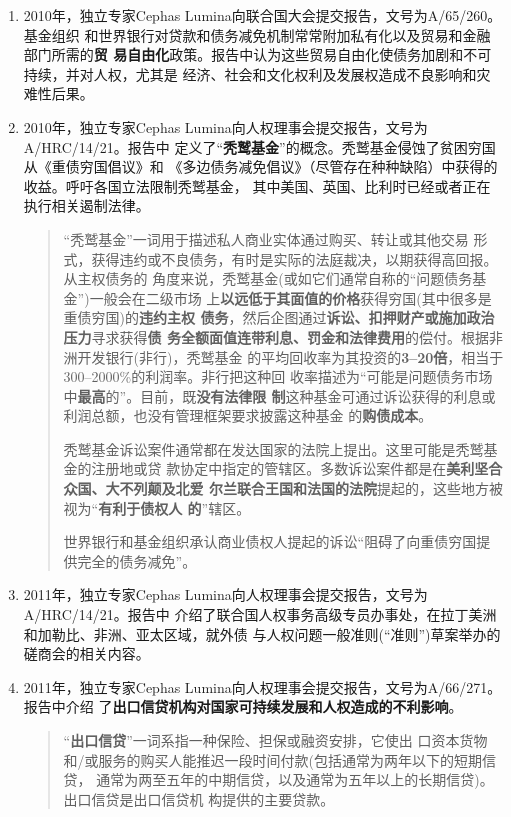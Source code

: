 \begin{enumerate}
\item 2010年，独立专家Cephas Lumina向联合国大会提交报告，文号为A/65/260。基金组织
  和世界银行对贷款和债务减免机制常常附加私有化以及贸易和金融部门所需的\textbf{贸
    易自由化}政策。报告中认为这些贸易自由化使债务加剧和不可持续，并对人权，尤其是
  经济、社会和文化权利及发展权造成不良影响和灾难性后果。

\item 2010年，独立专家Cephas Lumina向人权理事会提交报告，文号为A/HRC/14/21。报告中
  定义了“\textbf{秃鹫基金}”的概念。秃鹫基金侵蚀了贫困穷国从《重债穷国倡议》和
  《多边债务减免倡议》（尽管存在种种缺陷）中获得的收益。呼吁各国立法限制秃鹫基金，
  其中美国、英国、比利时已经或者正在执行相关遏制法律。
  \begin{quotation} “秃鹫基金”一词用于描述私人商业实体通过购买、转让或其他交易
    形式，获得违约或不良债务，有时是实际的法庭裁决，以期获得高回报。从主权债务的
    角度来说，秃鹫基金(或如它们通常自称的“问题债务基金”)一般会在二级市场
    上\textbf{以远低于其面值的价格}获得穷国(其中很多是重债穷国)的\textbf{违约主权
      债务}，然后企图通过\textbf{诉讼、扣押财产或施加政治压力}寻求获得\textbf{债
      务全额面值连带利息、罚金和法律费用}的偿付。根据非洲开发银行(非行)，秃鹫基金
    的平均回收率为其投资的\textbf{3--20倍}，相当于300--2000\%的利润率。非行把这种回
    收率描述为“可能是问题债务市场中\textbf{最高}的”。目前，既\textbf{没有法律限
      制}这种基金可通过诉讼获得的利息或利润总额，也没有管理框架要求披露这种基金
    的\textbf{购债成本}。

    秃鹫基金诉讼案件通常都在发达国家的法院上提出。这里可能是秃鹫基金的注册地或贷
    款协定中指定的管辖区。多数诉讼案件都是在\textbf{美利坚合众国、大不列颠及北爱
      尔兰联合王国和法国的法院}提起的，这些地方被视为“\textbf{有利于债权人
      的}”辖区。

    世界银行和基金组织承认商业债权人提起的诉讼“阻碍了向重债穷国提供完全的债务减免”。
  \end{quotation}

\item 2011年，独立专家Cephas Lumina向人权理事会提交报告，文号为A/HRC/14/21。报告中
  介绍了联合国人权事务高级专员办事处，在拉丁美洲和加勒比、非洲、亚太区域，就外债
  与人权问题一般准则(“准则”)草案举办的磋商会的相关内容。

\item 2011年，独立专家Cephas Lumina向人权理事会提交报告，文号为A/66/271。报告中介绍
  了\textbf{出口信贷机构对国家可持续发展和人权造成的不利影响}。

  \begin{quotation} “\textbf{出口信贷}”一词系指一种保险、担保或融资安排，它使出
    口资本货物和/或服务的购买人能推迟一段时间付款(包括通常为两年以下的短期信贷，
    通常为两至五年的中期信贷，以及通常为五年以上的长期信贷)。出口信贷是出口信贷机
    构提供的主要贷款。


\end{quotation}
\end{enumerate}
